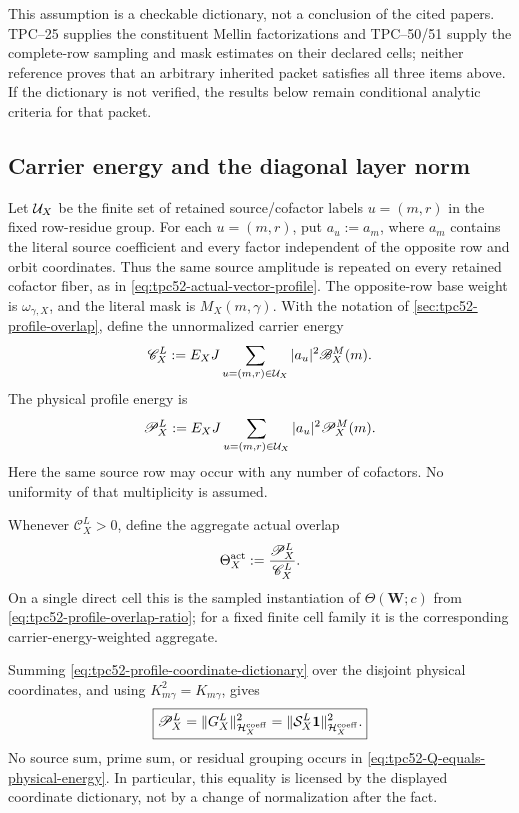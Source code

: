 This assumption is a checkable dictionary, not a conclusion of the cited
papers.  TPC--25 supplies the constituent Mellin factorizations and
TPC--50/51 supply the complete-row sampling and mask estimates on their
declared cells; neither reference proves that an arbitrary inherited packet
satisfies all three items above.  If the dictionary is not verified, the
results below remain conditional analytic criteria for that packet.

\subsection{Carrier energy and the diagonal layer norm}

Let \(\mathcal U_X\) be the finite set of retained source/cofactor labels
\(u=(m,r)\) in the fixed row-residue group.  For each \(u=(m,r)\), put
\(a_u:=a_m\), where \(a_m\) contains the literal source coefficient and
every factor independent of the opposite row and orbit coordinates.  Thus
the same source amplitude is repeated on every retained cofactor fiber, as
in \eqref{eq:tpc52-actual-vector-profile}.  The opposite-row base weight is
\(\omega_{\gamma,X}\), and the literal mask is
\(M_X(m,\gamma)\).  With the notation of
\cref{sec:tpc52-profile-overlap}, define the unnormalized carrier energy
\begin{equation}
 \mathscr C_X^L
 :=E_XJ\sum_{u=(m,r)\in\mathcal U_X}
       |a_u|^2\mathscr B_X^M(m).
 \label{eq:tpc52-actual-carrier-energy}
\end{equation}
The physical profile energy is
\begin{equation}
 \mathscr P_X^L
 :=E_XJ\sum_{u=(m,r)\in\mathcal U_X}
       |a_u|^2\mathscr P_X^M(m).
 \label{eq:tpc52-actual-profile-energy}
\end{equation}
Here the same source row may occur with any number of cofactors.  No
uniformity of that multiplicity is assumed.

Whenever \(\mathscr C_X^L>0\), define the aggregate actual overlap
\begin{equation}
 \Theta_X^{\rm act}
 :=\frac{\mathscr P_X^L}{\mathscr C_X^L}.
 \label{eq:tpc52-aggregate-actual-overlap}
\end{equation}
On a single direct cell this is the sampled instantiation of
\(\Theta(\mathbf W;c)\) from
\eqref{eq:tpc52-profile-overlap-ratio}; for a fixed finite cell family it is
the corresponding carrier-energy-weighted aggregate.

Summing \eqref{eq:tpc52-profile-coordinate-dictionary} over the disjoint
physical coordinates, and using \(K_{m\gamma}^2=K_{m\gamma}\), gives
\begin{equation}
 \boxed{
 \mathscr P_X^L
 =\|G_X^L\|_{\mathcal H_X^{\rm coeff}}^2
 =\|\mathcal S_X^L\mathbf 1\|_{\mathcal H_X^{\rm coeff}}^2.}
 \label{eq:tpc52-Q-equals-physical-energy}
\end{equation}
No source sum, prime sum, or residual grouping occurs in
\eqref{eq:tpc52-Q-equals-physical-energy}.  In particular, this equality is
licensed by the displayed coordinate dictionary, not by a change of
normalization after the fact.

